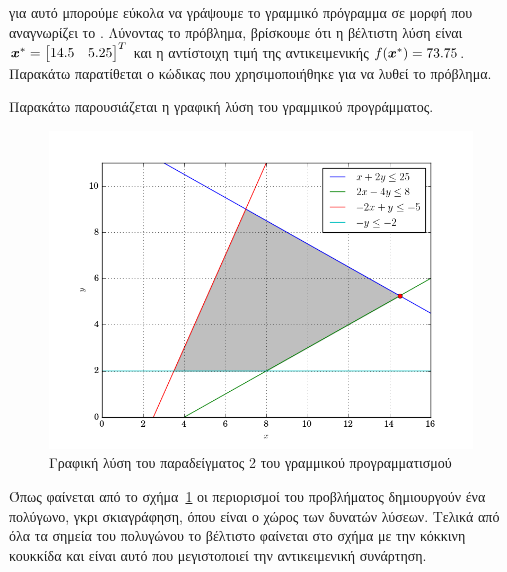για αυτό μπορούμε εύκολα να γράψουμε το γραμμικό πρόγραμμα σε μορφή που
αναγνωρίζει το . Λύνοντας το πρόβλημα, βρίσκουμε ότι η βέλτιστη λύση
είναι $\bm{x}^* = \begin{bmatrix} 14.5 & 5.25 \end{bmatrix}^T$ και η αντίστοιχη τιμή
της αντικειμενικής $f(\bm{x}^*) = 73.75$. Παρακάτω παρατίθεται ο κώδικας που
χρησιμοποιήθηκε για να λυθεί το πρόβλημα.
\begin{otherlanguage}{english}

\end{otherlanguage}
Παρακάτω παρουσιάζεται η γραφική λύση του γραμμικού προγράμματος.
\begin{figure}[h]
    \centering
    \includegraphics[width=\textwidth]{figures/lp2.png}
    \caption{Γραφική λύση του παραδείγματος 2
    του γραμμικού προγραμματισμού}\label{fig:lp2}
\end{figure}
Όπως φαίνεται από το σχήμα~\ref{fig:lp2} οι περιορισμοί του προβλήματος δημιουργούν
ένα πολύγωνο, γκρι σκιαγράφηση, όπου είναι ο χώρος των δυνατών λύσεων. Τελικά από όλα
τα σημεία του πολυγώνου το βέλτιστο φαίνεται στο σχήμα με την κόκκινη κουκκίδα και είναι
αυτό που μεγιστοποιεί την αντικειμενική συνάρτηση.

